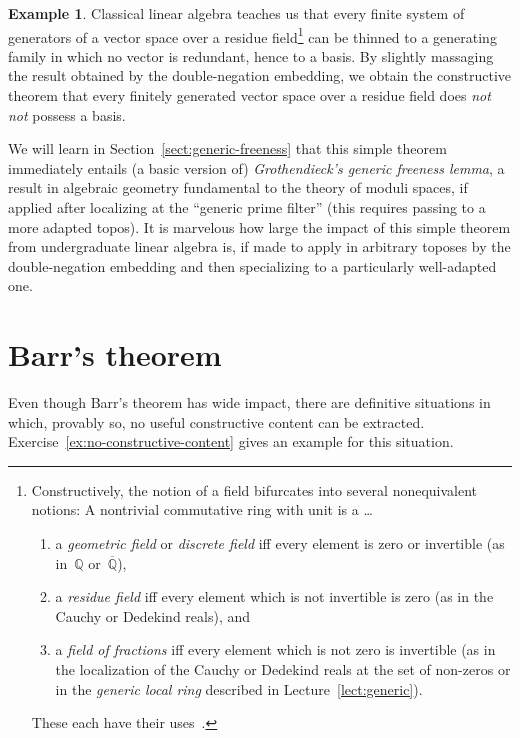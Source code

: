 \documentclass[10pt,reqno,a4paper,openany]{amsbook}
\theoremstyle{definition}
\newtheorem{ex}[defn]{Example}
\theoremstyle{plain}
\theoremstyle{remark}
\newcommand{\QQ}{\mathbb{Q}}
\newcommand{\?}{\,{:}\,}
\renewcommand{\_}{\mathpunct{.}\,}
\begin{document}
\begin{ex}Classical linear algebra teaches us that every finite system of
generators of a vector space over a residue field\footnote{\label{fn:fields}Constructively, the
notion of a field bifurcates into several nonequivalent notions: A nontrivial
commutative ring with unit is a \ldots
\begin{enumerate}
\item a \emph{geometric field} or \emph{discrete field} iff
every element is zero or
invertible (as in~$\QQ$ or~$\overline{\QQ}$),
\item a \emph{residue field} iff
every element which is not invertible is zero (as in the Cauchy or Dedekind
reals), and
\item a \emph{field of fractions} iff
every element which is not zero is invertible (as in the localization of the
Cauchy or Dedekind reals at the set of non-zeros or in the \emph{generic local
ring} described in Lecture~\ref{lect:generic}).
\end{enumerate}These each have their
uses~\cite{johnstone:rings-fields-and-spectra,mulvey:repr}.}
can be thinned to a generating family in which no vector is redundant, hence to
a basis. By slightly massaging the result obtained by the double-negation
embedding, we obtain the constructive theorem that every finitely generated
vector space over a residue field does \emph{not not} possess a basis.

We will learn in Section~\ref{sect:generic-freeness} that this simple theorem
immediately entails (a basic version of) \emph{Grothendieck's generic freeness
lemma}, a result in algebraic geometry fundamental to the theory of moduli
spaces, if applied after localizing at the ``generic prime filter'' (this
requires passing to a more adapted topos). It is marvelous how large the impact
of this simple theorem from undergraduate linear algebra is, if made to apply
in arbitrary toposes by the double-negation embedding and then specializing to
a particularly well-adapted one.\end{ex}


\section{Barr's theorem}
\newpage

Even though Barr's theorem has wide impact, there are definitive situations in
which, provably so, no useful constructive content can be extracted.
Exercise~\ref{ex:no-constructive-content} gives an example for this situation.
\end{document}
